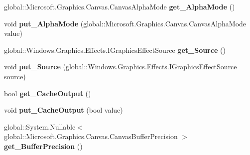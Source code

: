\begin{DoxyCompactItemize}
\item 
\mbox{\label{class_microsoft_1_1_graphics_1_1_canvas_1_1_effects_1_1_sepia_effect_ac68e49d7dca255583a419f008aae3de1}} 
global\+::\+Microsoft.\+Graphics.\+Canvas.\+Canvas\+Alpha\+Mode {\bfseries get\+\_\+\+Alpha\+Mode} ()
\item 
\mbox{\label{class_microsoft_1_1_graphics_1_1_canvas_1_1_effects_1_1_sepia_effect_a754dd727263b3e8cdf81de68d07ff1f9}} 
void {\bfseries put\+\_\+\+Alpha\+Mode} (global\+::\+Microsoft.\+Graphics.\+Canvas.\+Canvas\+Alpha\+Mode value)
\item 
\mbox{\label{class_microsoft_1_1_graphics_1_1_canvas_1_1_effects_1_1_sepia_effect_ae31d49568b53d15b07d27ddd36ab1436}} 
global\+::\+Windows.\+Graphics.\+Effects.\+I\+Graphics\+Effect\+Source {\bfseries get\+\_\+\+Source} ()
\item 
\mbox{\label{class_microsoft_1_1_graphics_1_1_canvas_1_1_effects_1_1_sepia_effect_a4ac2ac241338b189e8e7deaf3bccc8ba}} 
void {\bfseries put\+\_\+\+Source} (global\+::\+Windows.\+Graphics.\+Effects.\+I\+Graphics\+Effect\+Source source)
\item 
\mbox{\label{class_microsoft_1_1_graphics_1_1_canvas_1_1_effects_1_1_sepia_effect_af7c18e109fe745228141b8e8209c29e1}} 
bool {\bfseries get\+\_\+\+Cache\+Output} ()
\item 
\mbox{\label{class_microsoft_1_1_graphics_1_1_canvas_1_1_effects_1_1_sepia_effect_ad970b5b7f1dd4ac8b3cb7d43f0ac874f}} 
void {\bfseries put\+\_\+\+Cache\+Output} (bool value)
\item 
\mbox{\label{class_microsoft_1_1_graphics_1_1_canvas_1_1_effects_1_1_sepia_effect_a3272bf412ffdcd507bb1f3c12712ff42}} 
global\+::\+System.\+Nullable$<$ global\+::\+Microsoft.\+Graphics.\+Canvas.\+Canvas\+Buffer\+Precision $>$ {\bfseries get\+\_\+\+Buffer\+Precision} ()

\end{DoxyCompactItemize}
